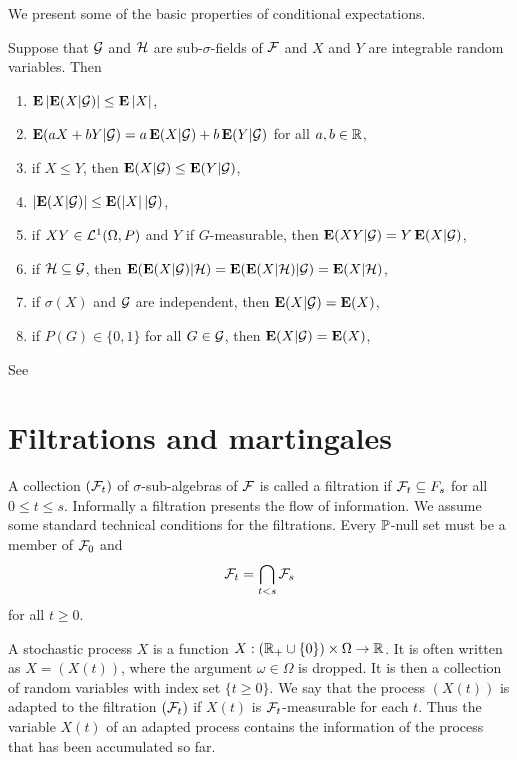 We present some of the basic properties of conditional expectations.

\begin{thm}
Suppose that $\G$ and $\Ho$ are sub-$\sigma$-fields of $\F$ and $X$ and $Y$ are integrable random variables. Then
  \begin{enumerate}[label=\roman*)]
    \item $\E \left| \E ( X | \G ) \right| \leq \E \left| X \right|$,
    \item $\E (aX+bY | \G ) = a\E (X | \G ) + b\E (Y | \G )$ for all $a,b \in \R$,
    \item if $X \leq Y$, then $\E (X| \G) \leq \E (Y| \G)$,
    \item $\left| \E (X | \G) \right| \leq \E (\left| X \right| | \G)$,
    \item if $XY \in \Le^1 (\Omega, P)$ and $Y$ if $G$-measurable, then $\E (XY | \G) = Y \E (X | \G)$,
    \item if $\Ho \subseteq \G$, then $\E ( \E (X | \G ) | \Ho ) = \E ( \E (X | \Ho ) | \G ) =  \E (X | \Ho )$,
    \item if $\sigma (X)$ and $\G$ are independent, then $\E (X | \G) = \E (X)$,
    \item if $P(G) \in \{ 0,1 \}$ for all $G \in \G$, then $\E (X | \G) = \E (X)$,
  \end{enumerate}
\end{thm}

See \textcite[pp. 472--477]{billingsley2012probabilityandmeasure}

\section{Filtrations and martingales}

A collection $(\F_t)$  of $\sigma$-sub-algebras of $\F$ is called a filtration if $\F_t \subseteq F_s$ for all $0 \leq t \leq s$. Informally a filtration presents the flow of information. We assume some standard technical conditions for the filtrations. Every $\Pf$-null set must be a member of $\F_0$ and
  \begin{align}
    \F_t = \bigcap_{t < s} \F_s
  \end{align}
for all $t \geq 0$.

A stochastic process $X$ is a function $X : (\R_+ \cup \{ 0 \}) \times \Omega \rightarrow \R$. It is often written as $X = (X(t))$, where the argument $\omega \in \Omega$ is dropped. It is then a collection of random variables with index set $\{t \geq 0\}$. We say that the process $(X(t))$ is adapted to the filtration $(\F_t)$ if $X(t)$ is $\F_t$-measurable for each $t$. Thus the variable $X(t)$ of an adapted process contains the information of the process that has been accumulated so far.

